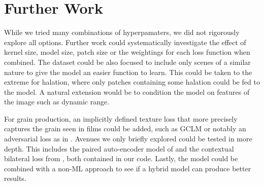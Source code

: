 \section{Further Work}
\label{sec:further-work}

While we tried many combinations of hyperpamaters, we did not rigorously explore all options. Further work could systematically investigate the effect of kernel size, model size, patch size or the weightings for each loss function when combined. The dataset could be also focused to include only scenes of a similar nature to give the model an easier function to learn. This could be taken to the extreme for halation, where only patches containing some halation could be fed to the model. A natural extension would be to condition the model on features of the image such as dynamic range. 

For grain production, an implicitly defined texture loss that more precisely captures the grain seen in films could be added, such as GCLM \cite{glcm} or notably an adversarial loss as in \cite{dslr-quality}. Avenues we only briefly explored could be tested in more depth. This includes the paired auto-encoder model of \cite{raw-to-raw} and the contextual bilateral loss from \cite{zoom-to-learn}, both contained in our code. Lastly, the model could be combined with a non-ML approach to see if a hybrid model can produce better results.